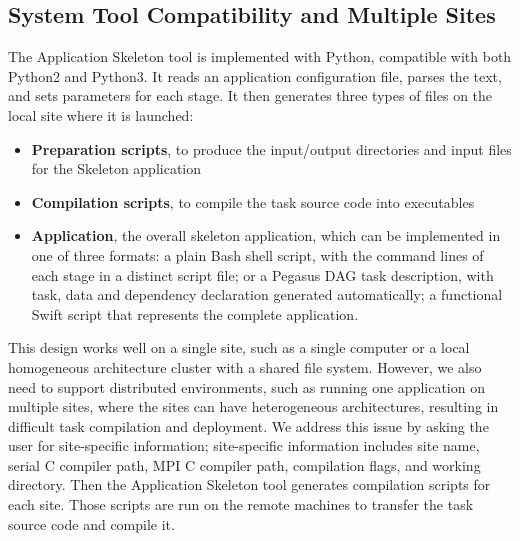 \documentclass[preprint,12pt]{elsarticle}
\begin{document}
\subsection{System Tool Compatibility and Multiple Sites}
The Application Skeleton tool is implemented with Python, compatible with both Python2 and Python3.  
It reads an application configuration file, parses the text, and sets parameters for each stage.
It then generates three types of files on the local site where it is launched:

\begin{itemize}
\item[] \textbf{Preparation scripts}, to produce the input/output directories and input files for the Skeleton application
\item[] \textbf{Compilation scripts}, to compile the task source code into executables 
\item[] \textbf{Application}, the overall skeleton application, which can be implemented in one of three formats: a plain Bash shell script, with the command lines of each stage in a distinct script file; or a Pegasus DAG task description, with task, data and dependency declaration generated automatically; a functional Swift script that represents the complete application. 
\end{itemize}



This design works well on a single site, such as a single computer or a local homogeneous architecture cluster with a shared file system. However, we also need to support distributed environments, such as running one application on multiple sites, where the sites can have
heterogeneous architectures, resulting in difficult task compilation and deployment. We address this  issue by asking the user for site-specific
information; site-specific information includes site name, serial C compiler path, MPI C compiler path, compilation 
flags, and working directory. Then the Application Skeleton tool generates compilation scripts for each site. Those scripts are run on the remote machines to transfer
the task source code and compile it. 

%
\end{document}
